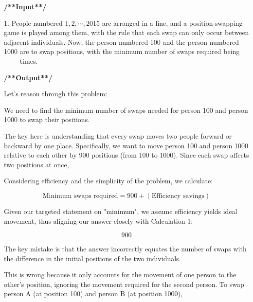\onecolumn
\begin{tcolorbox}[
    title=Training Data Format of \method: Correction Trajectories,
    colback=white,
    colframe=black!75!white,
    breakable,
    boxrule=0.8pt,
    left=2mm,
    right=2mm,
    top=1mm,
    bottom=1mm
]
\label{tab:traing_data}
\begin{spacing}{1.1}

\textbf{/**Input**/}  

1. People numbered $1,2,\cdots,2015$ are arranged in a line, and a position-swapping game is played among them, with the rule that each swap can only occur between adjacent individuals. Now, the person numbered 100 and the person numbered 1000 are to swap positions, with the minimum number of swaps required being $\qquad$ times.  

\textbf{/**Output**/}  

\textbf{\color{purple}{<answer>}}  

Let's reason through this problem:

We need to find the minimum number of swaps needed for person 100 and person 1000 to swap their positions.

The key here is understanding that every swap moves two people forward or backward by one place. Specifically, we want to move person 100 and person 1000 relative to each other by 900 positions (from 100 to 1000). Since each swap affects two positions at once, 

\vspace{\medskipamount}
\textit{\color{gray}{( ... more reasoning tokens omitted for brevity )}} 

Considering efficiency and the simplicity of the problem, we calculate:

\[
\text{Minimum swaps required} = 900 + (\text{Efficiency savings})
\]

Given our targeted statement on "minimum", we assume efficiency yields ideal movement, thus aligning our answer closely with Calculation 1:

\[
\boxed{900}
\]
\textbf{\color{purple}{</answer>}}  

\textbf{\color{purple}{</critic>}}  

The key mistake is that the answer incorrectly equates the number of swaps with the difference in the initial positions of the two individuals.

This is wrong because it only accounts for the movement of one person to the other's position, ignoring the movement required for the second person. To swap person A (at position 100) and person B (at position 1000), 
\vspace{\medskipamount}
\textit{\color{gray}{( ... more reasoning tokens omitted for brevity )}} 


\end{spacing}
\end{tcolorbox}
